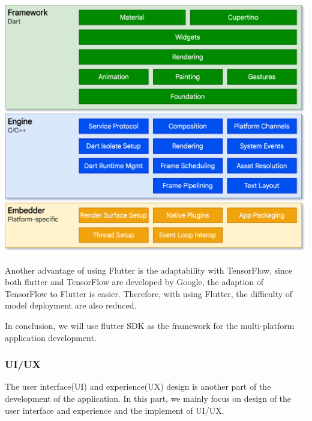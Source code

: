                 \begin{Figure}
                    \centering
                    \includegraphics[width=\linewidth]{Image/Flutterarchdiagram.png}
                \end{Figure}

                Another advantage of using Flutter is the adaptability with TensorFlow, since both flutter and TensorFlow are developed by Google, the adaption of TensorFlow to Flutter is easier. Therefore, with using Flutter, the difficulty of model deployment are also reduced.

                In conclusion, we will use flutter SDK as the framework for the multi-platform application development.
            \subsubsection{UI/UX}
                The user interface(UI) and experience(UX) design is another part of the development of the application. In this part, we mainly focus on design of the user interface and experience and the implement of UI/UX.

